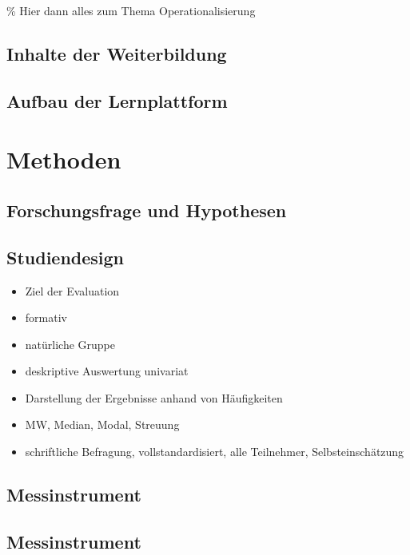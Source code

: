\documentclass[12pt, bibliography=totoc]{scrartcl}
\begin{document}
\% Hier dann alles zum Thema Operationalisierung

\subsection{Inhalte der Weiterbildung}\label{inhalte-der-weiterbildung}

\subsection{Aufbau der Lernplattform}\label{aufbau-der-lernplattform}

\section{Methoden}\label{methoden}

\subsection{Forschungsfrage und
Hypothesen}\label{forschungsfrage-und-hypothesen}

\subsection{Studiendesign}\label{studiendesign}

\begin{itemize}
\tightlist
\item
  Ziel der Evaluation
\item
  formativ
\item
  natürliche Gruppe
\item
  deskriptive Auswertung univariat
\item
  Darstellung der Ergebnisse anhand von Häufigkeiten
\item
  MW, Median, Modal, Streuung
\item
  schriftliche Befragung, vollstandardisiert, alle Teilnehmer,
  Selbsteinschätzung
\end{itemize}

\subsection{Messinstrument}\label{messinstrument}

\subsection{Messinstrument}\label{messinstrument-1}
\end{document}
